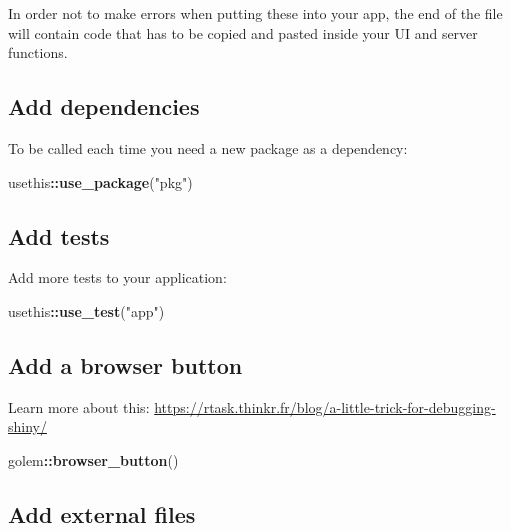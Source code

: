 \documentclass[]{book}
\newenvironment{Shaded}{\begin{snugshade}}{\end{snugshade}}
\newcommand{\KeywordTok}[1]{\textcolor[rgb]{0.13,0.29,0.53}{\textbf{#1}}}
\newcommand{\NormalTok}[1]{#1}
\newcommand{\OperatorTok}[1]{\textcolor[rgb]{0.81,0.36,0.00}{\textbf{#1}}}
\newcommand{\StringTok}[1]{\textcolor[rgb]{0.31,0.60,0.02}{#1}}
\begin{document}
In order not to make errors when putting these into your app, the end of the file will contain code that has to be copied and pasted inside your UI and server functions.

\hypertarget{add-dependencies}{%
\subsection{Add dependencies}\label{add-dependencies}}

To be called each time you need a new package as a dependency:

\begin{Shaded}
\begin{Highlighting}[]
\NormalTok{usethis}\OperatorTok{::}\KeywordTok{use_package}\NormalTok{(}\StringTok{"pkg"}\NormalTok{)}
\end{Highlighting}
\end{Shaded}

\hypertarget{add-tests}{%
\subsection{Add tests}\label{add-tests}}

Add more tests to your application:

\begin{Shaded}
\begin{Highlighting}[]
\NormalTok{usethis}\OperatorTok{::}\KeywordTok{use_test}\NormalTok{(}\StringTok{"app"}\NormalTok{)}
\end{Highlighting}
\end{Shaded}

\hypertarget{add-a-browser-button}{%
\subsection{Add a browser button}\label{add-a-browser-button}}

Learn more about this: \url{https://rtask.thinkr.fr/blog/a-little-trick-for-debugging-shiny/}

\begin{Shaded}
\begin{Highlighting}[]
\NormalTok{golem}\OperatorTok{::}\KeywordTok{browser_button}\NormalTok{()}
\end{Highlighting}
\end{Shaded}

\hypertarget{add-external-files}{%
\subsection{Add external files}\label{add-external-files}}
\end{document}
